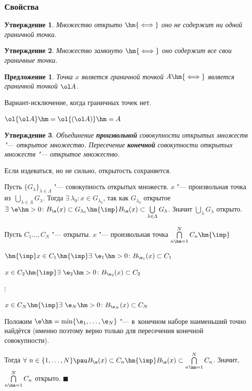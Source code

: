 \documentclass[a4paper,10pt,twoside]{article}
\newtheorem{Pre}{Предложение}[section]
\newtheorem{Ut}{Утверждение}[section]
\newenvironment{Proof}
       {\par\noindent{\textbf{Доказательство.}}}
       {\hfill$\scriptstyle\blacksquare$}
\begin{document}
\subsubsection{Свойства}

\begin{Ut}
    Множество открыто $\hm{\iff}$ оно не содержит ни одной граничной точки.
\end{Ut}

\begin{Ut}
    Множество замкнуто $\hm{\iff}$ оно содержит все свои граничные точки.
\end{Ut}

\begin{Pre}
    Точка $x$ является граничной точкой $A \hm{\iff}$ является граничной точкой $\ol A$.
\end{Pre}

Вариант-исключение, когда граничных точек нет.

$\ol{\ol A}\hm=\ol{(\ol A)}\hm=A$

\begin{Ut}
    Объединение \textbf{произвольной} совокупности открытых множеств "--- открытое множество. Пересечение \textbf{конечной} совокупности открытых множеств "--- открытое множество.
\end{Ut}

Если издеваться, но не сильно, открытость сохраняется.

\begin{Proof}
    Пусть $\Big\{G_\lambda\Big\}_{\lambda\in\Lambda}$
    "--- совокупность открытых множеств. $x$ "--- произвольная точка из~$\bigcup\limits_{\lambda\in\Lambda}G_\lambda$.
    Тогда $\exists\ \lambda_0\colon x\in G_{\lambda_0}$,
    так как $G_{\lambda_0}$ открытое $\exists\ \e\hm>0\colon B_\e(x)\subset G_{\lambda_0}
    \hm{\imp} B_\e(x)\subset\bigcup\limits_{\lambda\in\Lambda}G_\lambda$. Значит $\bigcup\limits_{\lambda}G_\lambda$ открыто.

    Пусть $C_1\ldots,C_N$ "--- открыты. $x$ "--- произвольная точка
    $\bigcap\limits_{n\hm=1}^{N}C_n\hm{\imp}$

    $\hm{\imp} x\in C_1\hm{\imp}\exists\  \e_1\hm>0\colon B_{\e_1}(x)\subset C_1$

    $x\in C_2\hm{\imp}\exists\ \e_2\hm>0\colon B_{\e_2}(x)\subset C_2$

    $\vdots$

    $x\in C_N\hm{\imp}\exists\ \e_N\hm>0\colon B_{\e_N}(x)\subset C_N$

    Положим $\e\hm=\min\{\e_1,\ldots,\e_N\}$ "--- в~конечном наборе наименьший точно найдётся (именно поэтому верно только для пересечения конечной совокупности).

    Тогда $\forall\  n\in\{1,\ldots,N\}\pau B_\e(x)\subset C_n\hm{\imp} B_\e(x)\subset
    \bigcap\limits_{n\hm=1}^NC_n$. Значит, $\bigcap\limits_{n\hm=1}^NC_n$ открыто.
\end{Proof}
\end{document}

